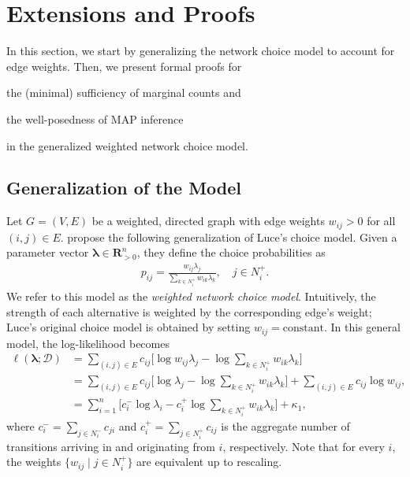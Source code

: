 \section{Extensions and Proofs}  %
\label{cr:app:extensions}

In this section, we start by generalizing the network choice model to account for edge weights.
Then, we present formal proofs for
\begin{enuminline}
\item the (minimal) sufficiency of marginal counts and
\item the well-posedness of MAP inference
\end{enuminline}
in the generalized weighted network choice model.

\subsection{Generalization of the Model}

Let $G = (V, E)$ be a weighted, directed graph with edge weights $w_{ij} > 0$ for all $(i, j) \in E$.
\citet{kumar2015inverting} propose the following generalization of Luce's choice model.
Given a parameter vector $\bm{\lambda} \in \mathbf{R}_{>0}^n$, they define the choice probabilities as
\begin{align}
\label{cr:eq:wsinglelik}
p_{ij} = \frac{w_{ij} \lambda_j}{\sum_{k \in N^+_i} w_{ik} \lambda_k}, \quad j \in N^+_i.
\end{align}
We refer to this model as the \emph{weighted network choice model}.
Intuitively, the strength of each alternative is weighted by the corresponding edge's weight;
Luce's original choice model is obtained by setting $w_{ij} = \text{constant}$.
In this general model, the log-likelihood becomes
\begin{align}
\ell(\bm{\lambda} ; \mathcal{D})
    &= \sum_{(i,j) \in E} c_{ij} \bigg[ \log w_{ij} \lambda_j - \log \sum_{k \in N^+_i} w_{ik} \lambda_k \bigg] \nonumber \\
    &= \sum_{(i,j) \in E} c_{ij} \bigg[ \log \lambda_j - \log \sum_{k \in N^+_i} w_{ik} \lambda_k \bigg] \nonumber
       + \sum_{(i,j) \in E} c_{ij} \log w_{ij}, \nonumber \\
    &= \sum_{i = 1}^n \bigg[ c^-_i \log \lambda_i - c^+_i \log\!\sum_{k \in N^+_i}\!w_{ik} \lambda_k \bigg] + \kappa_1, \label{cr:eq:wloglik}
\end{align}
where $c^-_i = \sum_{j \in N^-_i} c_{ji}$ and $c^+_i = \sum_{j \in N^+_i} c_{ij}$ is the aggregate number of transitions arriving in and originating from $i$, respectively.
Note that for every $i$, the weights $\{ w_{ij} \mid j \in N^+_i \}$ are equivalent up to rescaling.

